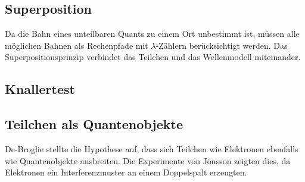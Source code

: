 \documentclass[a4paper]{article}
\begin{document}
		\subsection{Superposition}
			Da die Bahn eines unteilbaren Quants zu einem Ort unbestimmt ist, müssen alle möglichen Bahnen als Rechenpfade mit $\lambda$-Zählern berücksichtigt werden. Das Superpositionsprinzip verbindet das Teilchen und das Wellenmodell miteinander.
		\subsection{Knallertest}%
		\subsection{Teilchen als Quantenobjekte}%
		De-Broglie stellte die Hypothese auf, dass sich Teilchen wie Elektronen ebenfalls wie Quantenobjekte ausbreiten. Die Experimente von Jönsson zeigten dies, da Elektronen ein Interferenzmuster an einem Doppelspalt erzeugten.
		
\end{document}
